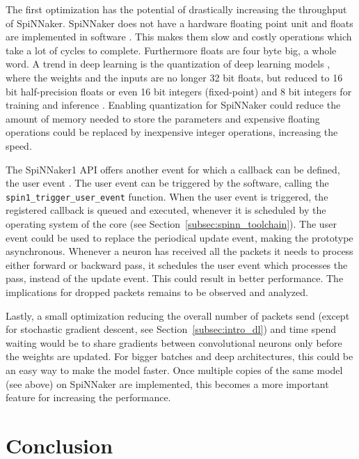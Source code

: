 \documentclass[]{article}
\begin{document}
The first optimization has the potential of drastically increasing
the throughput of SpiNNaker.
SpiNNaker does not have a hardware floating point unit and floats are
implemented in software \citep{furber_et_al_2020}.
This makes them slow and costly operations which take a lot of cycles
to complete.
Furthermore floats are four byte big, a whole word.
A trend in deep learning is the quantization of deep learning models
\citep{praveen_2020}, where the weights and the inputs are no longer
32 bit floats, but reduced to 16 bit half-precision floats or even
16 bit integers (fixed-point) and 8 bit integers for training and
inference \citep{das_et_al_2018}.
Enabling quantization for SpiNNaker could reduce the amount of memory
needed to store the parameters and expensive floating operations
could be replaced by inexpensive integer operations, increasing the
speed.

The SpiNNaker1 API offers another event for which a callback can
be defined, the user event \citep{furber_et_al_2020}.
The user event can be triggered by the software, calling the
\texttt{spin1\_\-trigger\_user\_event} function.
When the user event is triggered, the registered callback is queued
and executed, whenever it is scheduled by the operating system of the
core (see Section~\ref{subsec:spinn_toolchain}).
The user event could be used to replace the periodical update event,
making the prototype asynchronous.
Whenever a neuron has received all the packets it needs to process
either forward or backward pass, it schedules the user event which
processes the pass, instead of the update event.
This could result in better performance.
The implications for dropped packets remains to be observed and
analyzed.

Lastly, a small optimization reducing the overall number of packets
send (except for stochastic gradient descent, see
Section~\ref{subsec:intro_dl}) and time spend waiting would be to
share gradients between convolutional neurons only before the weights
are updated.
For bigger batches and deep architectures, this could be an easy way
to make the model faster.
Once multiple copies of the same model (see above) on SpiNNaker are
implemented, this becomes a more important feature for increasing the
performance.



\section{Conclusion} %
\label{sec:conclusion}
\end{document}
